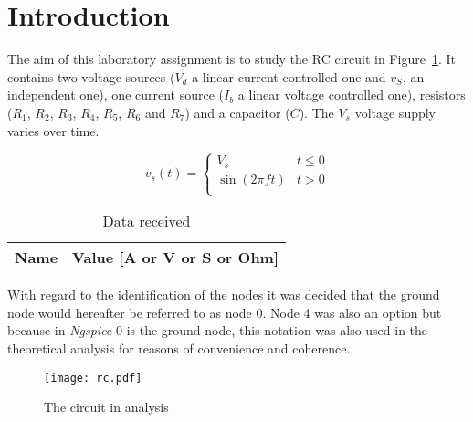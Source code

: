 \section{Introduction}
\label{sec:introduction}


The aim of this laboratory assignment is to study the RC circuit in Figure~\ref{fig:rc}. It contains two voltage sources ($V_d$ a linear current controlled one and $v_S$, an independent one), one current source ($I_b$ a linear voltage controlled one), resistors ($R_1$, $R_2$, $R_3$, $R_4$, $R_5$, $R_6$ and $R_7$) and a capacitor ($C$).
The $V_s$ voltage supply varies over time.

\[ 
v_s (t)= \left\{
\begin{array}{ll}
      V_s & t \leq 0 \\
      \sin(2 \pi f t) & t>0\\
\end{array} 
\right. 
\]

\begin{table}[hbt!]
  \centering
  \begin{tabular}{|c|c|}
    \hline    
    {\bf Name} & {\bf Value [A or V or S or Ohm]} \\ \hline
    
  \end{tabular}
  \caption{Data received}
  \label{tab:data}
\end{table}



With regard to the identification of the nodes it was decided that the ground node would hereafter be referred to as node 0. Node 4 was also an option but because in \textit{Ngspice} 0 is the ground node, this notation was also used in the theoretical analysis for reasons of convenience and coherence.


\begin{figure}[h] \centering
\texttt{[image: rc.pdf]}
\caption{The circuit in analysis}
\label{fig:rc}
\end{figure}




%    



